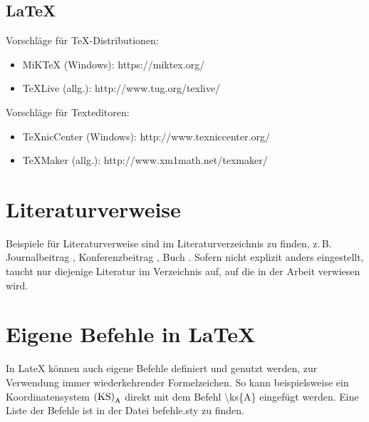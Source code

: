\subsection{LaTeX}
Vorschläge für TeX-Distributionen:
\begin{itemize}
	\item MiKTeX (Windows): https://miktex.org/
	\item TeXLive (allg.): http://www.tug.org/texlive/
\end{itemize}

Vorschläge für Texteditoren:
\begin{itemize}
	\item TeXnicCenter (Windows): http://www.texniccenter.org/
	\item TeXMaker (allg.): http://www.xm1math.net/texmaker/
\end{itemize}


\section{Literaturverweise}
Beispiele für Literaturverweise sind im Literaturverzeichnis zu finden, z.\,B. Journalbeitrag \cite{Ber59}, Konferenzbeitrag \cite{Hussong08}, Buch \cite{Wintermantel09}. Sofern nicht explizit anders eingestellt, taucht nur diejenige Literatur im Verzeichnis auf, auf die in der Arbeit verwiesen wird.


\section{Eigene Befehle in LaTeX}
In LateX können auch eigene Befehle definiert und genutzt werden, \zB zur Verwendung immer wiederkehrender Formelzeichen. So kann beispielsweise ein Koordinatensystem ${\mathrm{(KS)}}_{\mathrm{A}}$ direkt mit dem Befehl \textbackslash ks\{A\} eingefügt werden. Eine Liste der Befehle ist in der Datei befehle.sty zu finden.

